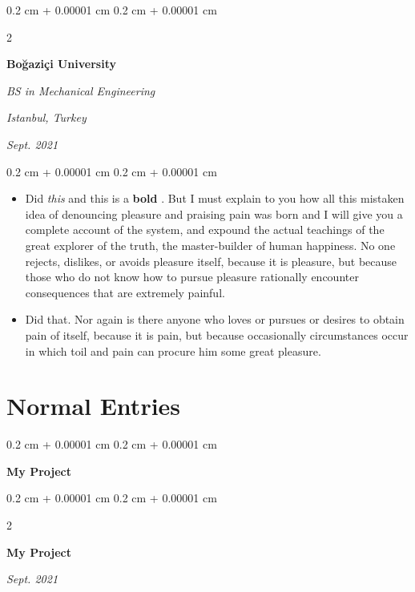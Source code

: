 \documentclass[10pt, letterpaper]{article}
\newenvironment{highlights}{
    \begin{itemize}[
        topsep=0.10 cm,
        parsep=0.10 cm,
        partopsep=0pt,
        itemsep=0pt,
        leftmargin=0.4 cm + 10pt
    ]
}{
    \end{itemize}
} %
\newenvironment{onecolentry}{
    \begin{adjustwidth}{
        0.2 cm + 0.00001 cm
    }{
        0.2 cm + 0.00001 cm
    }
}{
    \end{adjustwidth}
} %
\newenvironment{twocolentry}[2][]{
    \onecolentry
    \def\secondColumn{#2}
    \setcolumnwidth{\fill, 4.5 cm}
    \begin{paracol}{2}
}{
    \switchcolumn \raggedleft \secondColumn
    \end{paracol}
    \endonecolentry
} %
\let\hrefWithoutArrow\href
\renewcommand{\href}[2]{\hrefWithoutArrow{#1}{\mbox{\ifthenelse{\equal{#2}{}}{ }{#2 }\raisebox{.15ex}{\footnotesize \faExternalLink*}}}}
\begin{document}
        \vspace{0.2 cm-3px}

        \begin{twocolentry}{
        \textit{Istanbul, Turkey}    
            
        \textit{Sept. 2021}}
            \textbf{Boğaziçi University}

            \textit{BS in Mechanical Engineering}
        \end{twocolentry}

        \vspace{0.10 cm-3px}
        \begin{onecolentry}
            \begin{highlights}
                \item Did \textit{this} and this is a \textbf{bold} \href{https://example.com}{link}. But I must explain to you how all this mistaken idea of denouncing pleasure and praising pain was born and I will give you a complete account of the system, and expound the actual teachings of the great explorer of the truth, the master-builder of human happiness. No one rejects, dislikes, or avoids pleasure itself, because it is pleasure, but because those who do not know how to pursue pleasure rationally encounter consequences that are extremely painful.
                \item Did that. Nor again is there anyone who loves or pursues or desires to obtain pain of itself, because it is pain, but because occasionally circumstances occur in which toil and pain can procure him some great pleasure.
            \end{highlights}
        \end{onecolentry}



    
    \section{Normal Entries}

        
        \begin{onecolentry}
            \textbf{My Project}
        \end{onecolentry}



        \vspace{0.2 cm-3px}

        \begin{twocolentry}{
            
            
        \textit{Sept. 2021}}
            \textbf{My Project}
        \end{twocolentry}
\end{document}
